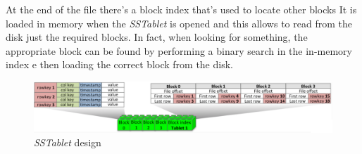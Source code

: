 At the end of the file there's a block index that's used to locate other blocks
It is loaded in memory when the \emph{SSTablet} is opened and this allows to
read from the disk just the required blocks. In fact, when looking for something,
the appropriate block can be found by performing a binary search in the in-memory
index e then loading the correct block from the disk.

\begin{figure}[ht!]
    \centering
    \includegraphics[width=\textwidth]{images/sstable-format.png}
    \caption{\emph{SSTablet} design}
\end{figure}


